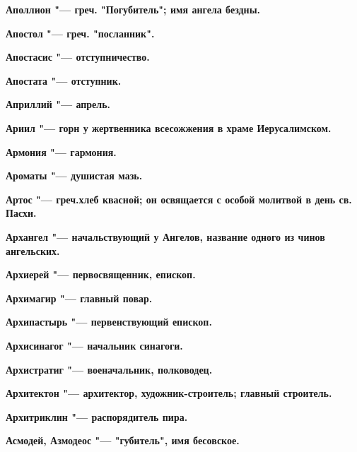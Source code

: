 \bfseries Аполлион \normalfont{} "--- греч. "Погубитель"; имя ангела бездны. 




\bfseries Апостол \normalfont{} "--- греч. "посланник". 




\bfseries Апостасис \normalfont{} "--- отступничество. 




\bfseries Апостата \normalfont{} "--- отступник. 




\bfseries Априллий \normalfont{} "--- апрель. 




\bfseries Ариил \normalfont{} "--- горн у жертвенника всесожжения в храме Иерусалимском. 




\bfseries Армония \normalfont{} "--- гармония. 




\bfseries Ароматы \normalfont{} "--- душистая мазь. 




\bfseries Артос \normalfont{} "--- греч.хлеб квасной; он освящается с особой молитвой в день св. Пасхи. 




\bfseries Архангел \normalfont{} "--- начальствующий у Ангелов, название одного из чинов ангельских. 




\bfseries Архиерей \normalfont{} "--- первосвященник, епископ. 




\bfseries Архимагир \normalfont{} "--- главный повар. 




\bfseries Архипастырь \normalfont{} "--- первенствующий епископ. 




\bfseries Архисинагог \normalfont{} "--- начальник синагоги. 




\bfseries Архистратиг \normalfont{} "--- военачальник, полководец. 




\bfseries Архитектон \normalfont{} "--- архитектор, художник-строитель; главный строитель. 




\bfseries Архитриклин \normalfont{} "--- распорядитель пира. 




\bfseries Асмодей, Азмодеос \normalfont{} "--- "губитель", имя бесовское. 




